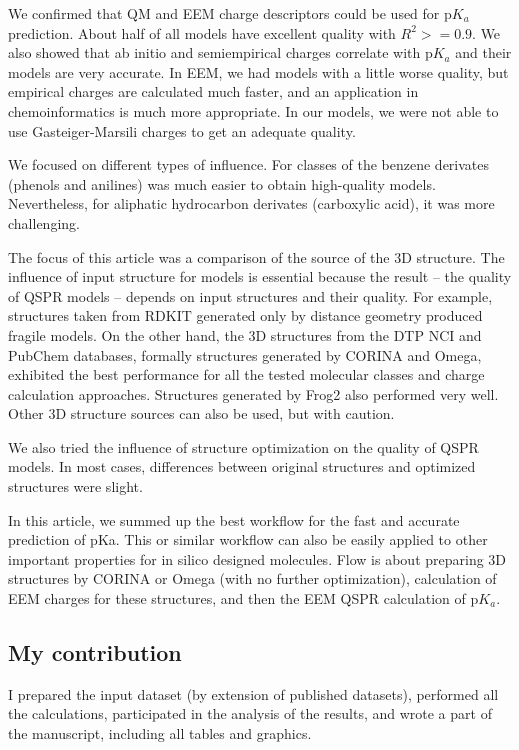 We confirmed that QM and EEM charge descriptors could be used for p$K_a$
prediction. About half of all models have excellent quality with $R^2 >= 0.9$.
We also showed that ab initio and semiempirical charges correlate with p$K_a$
and their models are very accurate. In EEM, we had models with a little worse
quality, but empirical charges are calculated much faster, and an application
in chemoinformatics is much more appropriate. In our models, we were not able
to use Gasteiger-Marsili charges to get an adequate quality. 

We focused on different types of influence. For classes of the benzene
derivates (phenols and anilines) was much easier to obtain high-quality models.
Nevertheless, for aliphatic hydrocarbon derivates (carboxylic acid), it was more
challenging.

The focus of this article was a comparison of the source of the 3D structure.
The influence of input structure for models is essential because
the result -- the quality of QSPR models -- depends on input structures and
their quality. For example, structures taken from RDKIT generated only by
distance geometry produced fragile models. On the other hand, the 3D structures
from the DTP NCI and PubChem databases, formally structures generated by CORINA
and Omega, exhibited the best performance for all the tested molecular classes
and charge calculation approaches. Structures generated by Frog2 also performed
very well. Other 3D structure sources can also be used, but with caution.

We also tried the influence of structure optimization on the quality of QSPR
models. In most cases, differences between original structures and optimized
structures were slight. 

In this article, we summed up the best workflow for the fast and accurate
prediction of pKa. This or similar workflow can also be easily applied to other
important properties for in silico designed molecules. Flow is about preparing
3D structures by CORINA or Omega (with no further optimization), calculation of
EEM charges for these structures, and then the EEM QSPR calculation of p$K_a$.

\subsection{My contribution}

I prepared the input dataset (by extension of published datasets), performed
all the calculations, participated in the analysis of the results, and wrote
a part of the manuscript, including all tables and graphics.


